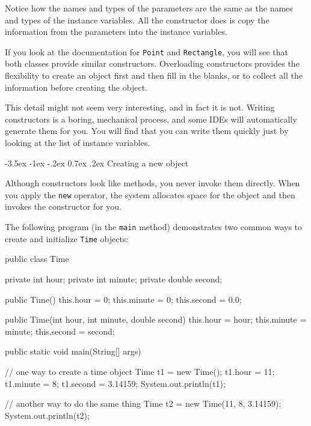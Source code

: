 \documentclass[12pt]{book}
\makeatletter
\renewcommand{\section}{\@startsection {section}{1}{\z@}%
    {-3.5ex \@plus -1ex \@minus -.2ex}%
    {0.7ex \@plus.2ex}%
    {\normalfont\Large\bfseries}}
\theoremstyle{exercise}
\newcommand{\java}[1]{\lstinline{#1}} %
\makeatother
\begin{document}
Notice how the names and types of the parameters are the same as the names and types of the instance variables.
All the constructor does is copy the information from the parameters into the instance variables.

If you look at the documentation for \java{Point} and \java{Rectangle}, you will see that both classes provide similar constructors.
Overloading constructors provides the flexibility to create an object first and then fill in the blanks, or to collect all the information before creating the object.

This detail might not seem very interesting, and in fact it is not.
Writing constructors is a boring, mechanical process, and some IDEs will automatically generate them for you.
You will find that you can write them quickly just by looking at the list of instance variables.


\section{Creating a new object}


Although constructors look like methods, you never invoke them directly.
When you apply the \java{new} operator, the system allocates space for the object and then invokes the constructor for you.

The following program (in the \java{main} method) demonstrates two common ways to create and initialize \java{Time} objects:

\begin{code}
public class Time {
    private int hour;
    private int minute;
    private double second;

    public Time() {
        this.hour = 0;
        this.minute = 0;
        this.second = 0.0;
    }

    public Time(int hour, int minute, double second) {
        this.hour = hour;
        this.minute = minute;
        this.second = second;
    }

    public static void main(String[] args) {
        // one way to create a time object
        Time t1 = new Time();
        t1.hour = 11;
        t1.minute = 8;
        t1.second = 3.14159;
        System.out.println(t1);

        // another way to do the same thing
        Time t2 = new Time(11, 8, 3.14159);
        System.out.println(t2);
    }
}
\end{code}
\end{document}
